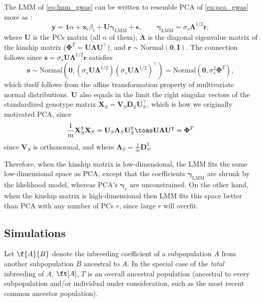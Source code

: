 \documentclass[11pt]{article}
\begin{document}
The LMM of \cref{eq:lmm_gwas} can be written to resemble PCA of \cref{eq:pca_gwas} more as \citep{astle_population_2009, hoffman_correcting_2013}:
\begin{equation}
  \label{eq:lmm_gwas_evd}
  \mathbf{y}
  =
  \mathbf{1} \alpha + \mathbf{x}_i \beta_i + \mathbf{U} \boldsymbol{\gamma}_\text{LMM} + \boldsymbol{\epsilon}
  , \quad\quad
  \boldsymbol{\gamma}_\text{LMM} = \sigma_s \boldsymbol{\Lambda}^{1/2} \mathbf{r}
  ,
\end{equation}
where $\mathbf{U}$ is the PCs matrix (all $n$ of them), $\boldsymbol{\Lambda}$ is the diagonal eigenvalue matrix of the kinship matrix ($\mathbf{\Phi}^T = \mathbf{U} \boldsymbol{\Lambda} \mathbf{U}^\intercal$), and $\mathbf{r} \sim \text{Normal}(\mathbf{0},\mathbf{I})$.
The connection follows since $\mathbf{s} = \sigma_s \mathbf{U} \boldsymbol{\Lambda}^{1/2} \mathbf{r}$ satisfies
$$
\mathbf{s} \sim \text{Normal} \left( \mathbf{0}, \left( \sigma_s \mathbf{U} \boldsymbol{\Lambda}^{1/2} \right) \left( \sigma_s \mathbf{U} \boldsymbol{\Lambda}^{1/2} \right)^\intercal \right)
= \text{Normal}( \mathbf{0}, \sigma_s^2 \mathbf{\Phi}^T ),
$$
which itself follows from the affine transformation property of multivariate normal distributions.
$\mathbf{U}$ also equals in the limit the right singular vectors of the standardized genotype matrix $\mathbf{X}_S = \mathbf{V}_S \mathbf{D}_S \mathbf{U}_S^\intercal$, which is how we originally motivated PCA, since
$$
\frac{1}{m} \mathbf{X}_S^\intercal \mathbf{X}_S
= \mathbf{U}_S \mathbf{\Lambda}_S \mathbf{U}_S^\intercal
\toas
\mathbf{U} \mathbf{\Lambda} \mathbf{U}^\intercal
=
\mathbf{\Phi}^T
$$
since $\mathbf{V}_S$ is orthonormal, and where $\mathbf{\Lambda}_S = \frac{1}{m} \mathbf{D}_S^2$.

Therefore, when the kinship matrix is low-dimensional, the LMM fits the same low-dimensional space as PCA, except that the coefficients $\boldsymbol{\gamma}_\text{LMM}$ are shrunk by the likelihood model, whereas PCA's $\boldsymbol{\gamma}_r$ are unconstrained.
On the other hand, when the kinship matrix is high-dimensional then LMM fits this space better than PCA with any number of PCs $r$, since large $r$ will overfit.

\subsection{Simulations}

Let $\f{A}{B}$ denote the inbreeding coefficient of a subpopulation $A$ from another subpopulation $B$ ancestral to $A$.
In the special case of the \textit{total} inbreeding of $A$, $\ft[A]$, $T$ is an overall ancestral population (ancestral to every subpopulation and/or individual under consideration, such as the most recent common ancestor population).
\end{document}
